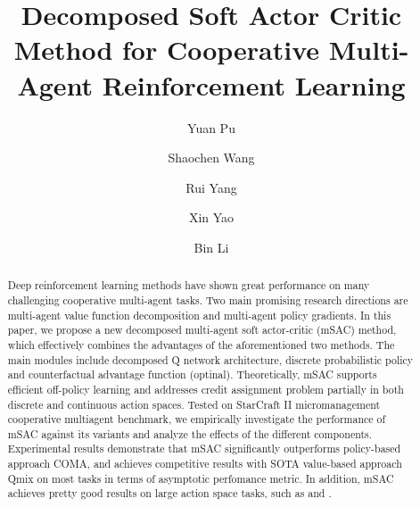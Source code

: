 \documentclass[runningheads]{llncs}
\begin{document}
\title{Decomposed Soft Actor Critic Method for Cooperative Multi-Agent Reinforcement Learning}\author{Yuan Pu\and
Shaochen Wang \and
Rui Yang\and
Xin Yao\and
Bin Li  }


\maketitle              \begin{abstract}
Deep reinforcement learning methods have shown great performance on many challenging cooperative multi-agent tasks. Two main promising research directions are multi-agent value function decomposition and multi-agent policy gradients. In this paper, we propose a new decomposed multi-agent soft actor-critic (mSAC) method, which effectively combines
the advantages of the aforementioned two methods.
The main modules include decomposed Q network architecture, discrete probabilistic policy and counterfactual advantage function (optinal).
Theoretically, mSAC supports efficient off-policy learning and addresses credit assignment problem partially in both discrete and continuous action spaces. Tested on StarCraft II micromanagement cooperative multiagent benchmark, we empirically investigate the performance of mSAC against its variants and analyze the effects of the different components. Experimental results demonstrate that mSAC significantly outperforms policy-based approach COMA, and achieves competitive results with SOTA value-based approach Qmix on most tasks in terms of asymptotic perfomance metric. In addition, mSAC achieves pretty good results on large action space tasks, such as  and .

\end{abstract}
\end{document}
